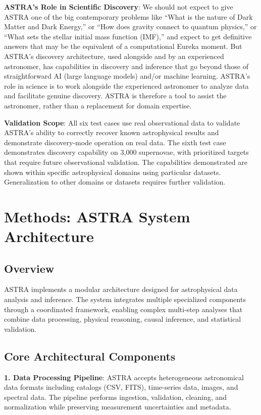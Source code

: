 \documentclass[usenatbib]{rasti}
\begin{document}
\textbf{ASTRA's Role in Scientific Discovery}: We should not expect to give ASTRA one of the big contemporary problems like ``What is the nature of Dark Matter and Dark Energy,'' or ``How does gravity connect to quantum physics,'' or ``What sets the stellar initial mass function (IMF),'' and expect to get definitive answers that may be the equivalent of a computational Eureka moment. But ASTRA's discovery architecture, used alongside and by an experienced astronomer, has capabilities in discovery and inference that go beyond those of straightforward AI (large language models) and/or machine learning. ASTRA's role in science is to work alongside the experienced astronomer to analyze data and facilitate genuine discovery. ASTRA is therefore a tool to assist the astronomer, rather than a replacement for domain expertise.

\textbf{Validation Scope}: All six test cases use real observational data to validate ASTRA's ability to correctly recover known astrophysical results and demonstrate discovery-mode operation on real data. The sixth test case demonstrates discovery capability on 3,000 supernovae, with prioritized targets that require future observational validation. The capabilities demonstrated are shown within specific astrophysical domains using particular datasets. Generalization to other domains or datasets requires further validation.

\section{Methods: ASTRA System Architecture}

\subsection{Overview}

ASTRA implements a modular architecture designed for astrophysical data analysis and inference. The system integrates multiple specialized components through a coordinated framework, enabling complex multi-step analyses that combine data processing, physical reasoning, causal inference, and statistical validation.

\subsection{Core Architectural Components}

\textbf{1. Data Processing Pipeline}: ASTRA accepts heterogeneous astronomical data formats including catalogs (CSV, FITS), time-series data, images, and spectral data. The pipeline performs ingestion, validation, cleaning, and normalization while preserving measurement uncertainties and metadata.
\end{document}
